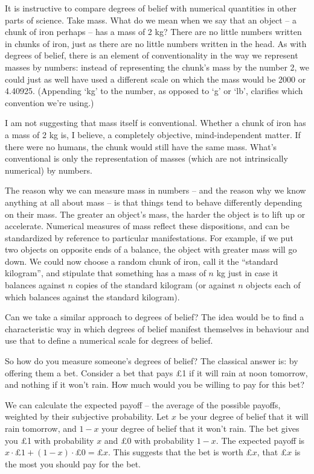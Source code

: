 It is instructive to compare degrees of belief with numerical quantities in
other parts of science. Take mass. What do we mean when we say that an object --
a chunk of iron perhaps -- has a mass of 2 kg? There are no little numbers
written in chunks of iron, just as there are no little numbers written in the
head. As with degrees of belief, there is an element of conventionality in the
way we represent masses by numbers: instead of representing the chunk's mass by
the number 2, we could just as well have used a different scale on which the
mass would be 2000 or 4.40925. (Appending `kg' to the number, as opposed to `g'
or `lb', clarifies which convention we're using.)

I am not suggesting that mass itself is conventional. Whether a chunk
of iron has a mass of 2 kg is, I believe, a completely objective, mind-independent
matter. If there were no humans, the chunk would still have the same
mass. What's conventional is only the representation of masses (which
are not intrinsically numerical) by numbers.

The reason why we can measure mass in numbers -- and the reason why we know
anything at all about mass -- is that things tend to behave differently
depending on their mass. The greater an object's mass, the harder the object is
to lift up or accelerate. Numerical measures of mass reflect these dispositions,
and can be standardized by reference to particular manifestations. For example,
if we put two objects on opposite ends of a balance, the object with greater mass
will go down. We could now choose a random chunk of iron, call it the ``standard
kilogram'', and stipulate that something has a mass of $n$ kg just in case it
balances against $n$ copies of the standard kilogram (or against $n$ objects
each of which balances against the standard kilogram).

Can we take a similar approach to degrees of belief? The idea would be to find a
characteristic way in which degrees of belief manifest themselves in behaviour
and use that to define a numerical scale for degrees of belief.

So how do you measure someone's degrees of belief? The classical answer is: by
offering them a bet. Consider a bet that pays £1 if it will rain at noon tomorrow, and
nothing if it won't rain. How much would you be willing to pay for
this bet?

We can calculate the expected payoff -- the average of the possible
payoffs, weighted by their subjective probability. Let $x$ be your degree of
belief that it will rain tomorrow, and $1\!-\!x$ your degree of belief that it won't
rain. The bet gives you £1 with probability $x$ and £0 with probability $1\!-\!x$.
The expected payoff is $x \cdot \text{£1} + (1\!-\!x) \cdot \text{£0} = \text{£}x$.
This suggests that the bet is worth £$x$, that £$x$ is the most you should
pay for the bet.

